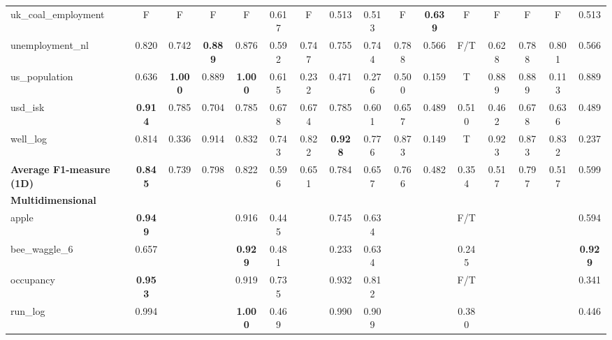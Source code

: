 \begin{table}
{\begin{tabular}{l|c|cccccccccccccc}
    \cellcolor{gray!100}uk\_coal\_employment & \cellcolor{gray!100}F & \cellcolor{gray!100}F & \cellcolor{gray!100}F & \cellcolor{gray!100}F & \cellcolor{gray!100}0.617 & \cellcolor{gray!100}F & \cellcolor{gray!100}0.513 & \cellcolor{gray!100}0.513 & \cellcolor{gray!100}F & \cellcolor{gray!100}\textbf{0.639} & \cellcolor{gray!100}F & \cellcolor{gray!100}F & \cellcolor{gray!100}F & \cellcolor{gray!100}F & \cellcolor{gray!100}0.513\\
    
    unemployment\_nl & 0.820 & 0.742 & \textbf{0.889} & 0.876 & 0.592 & 0.747 & 0.755 & 0.744 & 0.788 & 0.566 & F/T & 0.628 & 0.788 & 0.801 & 0.566\\
    
    us\_population & 0.636 & \textbf{1.000} & 0.889 & \textbf{1.000} & 0.615 & 0.232 & 0.471 & 0.276 & 0.500 & 0.159 & T & 0.889 & 0.889 & 0.113 & 0.889\\
    
    usd\_isk & \textbf{0.914} & 0.785 & 0.704 & 0.785 & 0.678 & 0.674 & 0.785 & 0.601 & 0.657 & 0.489 & 0.510 & 0.462 & 0.678 & 0.636 & 0.489\\
    
    well\_log & 0.814 & 0.336 & 0.914 & 0.832 & 0.743 & 0.822 & \textbf{0.928} & 0.776 & 0.873 & 0.149 & T & 0.923 & 0.873 & 0.832 & 0.237\\
    
    \midrule

    \textbf{Average F1-measure (1D)} & \textbf{0.845} & 0.739 & 0.798 & 0.822 & 0.596 & 0.651 & 0.784 & 0.657 & 0.766 & 0.482 & 0.354 & 0.517 & 0.797 & 0.517 & 0.599\\
    
    \midrule

    \multicolumn{16}{l}{\textbf{Multidimensional}} \\

    \midrule
    
    apple & \textbf{0.949} &  &  & 0.916 & 0.445 &  & 0.745 & 0.634 &  &  & F/T &  &  &  & 0.594\\
    
    bee\_waggle\_6 & 0.657 &  &  & \textbf{0.929} & 0.481 &  & 0.233 & 0.634 &  &  & 0.245 &  &  &  & \textbf{0.929}\\
    
    occupancy & \textbf{0.953} &  &  & 0.919 & 0.735 &  & 0.932 & 0.812 &  &  & F/T &  &  &  & 0.341\\
    
    run\_log & 0.994 &  &  & \textbf{1.000} & 0.469 &  & 0.990 & 0.909 &  &  & 0.380 &  &  &  & 0.446\\
    

\end{tabular}}
\end{table}
